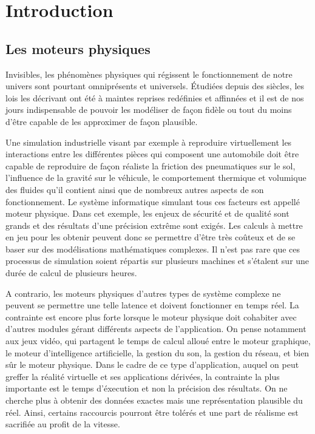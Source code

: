 \section{Introduction}

\subsection{Les moteurs physiques}

Invisibles, les phénomènes physiques qui régissent le fonctionnement
de notre univers sont pourtant omniprésents et universels. \'Etudiées
depuis des siècles, les lois les décrivant ont été à maintes reprises
redéfinies et affinnées et il est de nos jours indispensable de
pouvoir les modéliser de façon fidèle ou tout du moins d'être capable
de les approximer de façon plausible.

Une simulation industrielle visant par exemple à reproduire
virtuellement les interactions entre les différentes pièces qui
composent une automobile doit être capable de reproduire de façon
réaliste la friction des pneumatiques sur le sol, l'influence de la
gravité sur le véhicule, le comportement thermique et volumique des
fluides qu'il contient ainsi que de nombreux autres aspects de son
fonctionnement. Le système informatique simulant tous ces facteurs est
appellé moteur physique. Dans cet exemple, les enjeux de sécurité et
de qualité sont grands et des résultats d'une précision extrême sont
exigés. Les calculs à mettre en jeu pour les obtenir peuvent donc se
permettre d'être très coûteux et de se baser sur des modélisations
mathématiques complexes. Il n'est pas rare que ces processus de
simulation soient répartis sur plusieurs machines et s'étalent sur une
durée de calcul de plusieurs heures.

A contrario, les moteurs physiques d'autres types de système complexe
ne peuvent se permettre une telle latence et doivent fonctionner en
temps réel. La contrainte est encore plus forte lorsque le moteur
physique doit cohabiter avec d'autres modules gérant différents
aspects de l'application. On pense notamment aux jeux vidéo, qui
partagent le temps de calcul alloué entre le moteur graphique, le
moteur d'intelligence artificielle, la gestion du son, la gestion du
réseau, et bien sûr le moteur physique. Dans le cadre de ce type
d'application, auquel on peut greffer la réalité virtuelle et ses
applications dérivées, la contrainte la plus importante est le temps
d'éxecution et non la précision des résultats. On ne cherche plus à
obtenir des données exactes mais une représentation plausible du
réel. Ainsi, certains raccourcis pourront être tolérés et une part de
réalisme est sacrifiée au profit de la vitesse.

